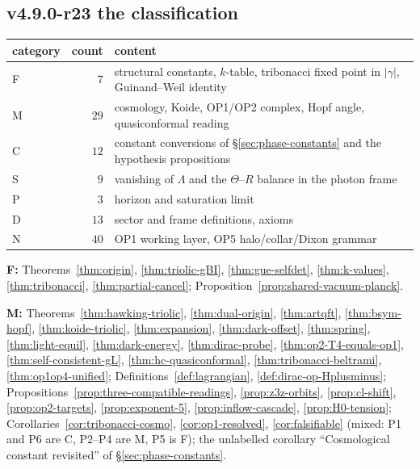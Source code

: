 \subsection*{v4.9.0-r23 the classification}
\label{subsec:v490-r23-classification}

\begin{center}
\small
\begin{tabular}{@{}lrl@{}}
\toprule
category & count & content\\
\midrule
F & \(7\) & structural constants, \(k\)-table, tribonacci fixed point in \(|\gamma|\), Guinand--Weil identity\\
M & \(29\) & cosmology, Koide, OP1/OP2 complex, Hopf angle, quasiconformal reading\\
C & \(12\) & constant conversions of \S\ref{sec:phase-constants} and the hypothesis propositions\\
S & \(9\) & vanishing of \(\Lambda\) and the \(\Theta\)--\(R\) balance in the photon frame\\
P & \(3\) & horizon and saturation limit\\
D & \(13\) & sector and frame definitions, axioms\\
N & \(40\) & OP1 working layer, OP5 halo/collar/Dixon grammar\\
\bottomrule
\end{tabular}
\end{center}

\noindent\textbf{F:} Theorems~\ref{thm:origin}, \ref{thm:triolic-gBI}, \ref{thm:gue-selfdet}, \ref{thm:k-values}, \ref{thm:tribonacci},
\ref{thm:partial-cancel}; Proposition~\ref{prop:shared-vacuum-planck}.

\noindent\textbf{M:} Theorems~\ref{thm:hawking-triolic}, \ref{thm:dual-origin}, \ref{thm:artqft}, \ref{thm:bsym-hopf},
\ref{thm:koide-triolic}, \ref{thm:expansion}, \ref{thm:dark-offset}, \ref{thm:spring}, \ref{thm:light-equil}, \ref{thm:dark-energy},
\ref{thm:dirac-probe}, \ref{thm:op2-T4-equals-op1}, \ref{thm:self-consistent-gL}, \ref{thm:hc-quasiconformal},
\ref{thm:tribonacci-beltrami}, \ref{thm:op1op4-unified}; Definitions~\ref{def:lagrangian}, \ref{def:dirac-op-Hplusminus};
Propositions~\ref{prop:three-compatible-readings}, \ref{prop:z3z-orbits}, \ref{prop:cl-shift}, \ref{prop:op2-targets},
\ref{prop:exponent-5}, \ref{prop:inflow-cascade}, \ref{prop:H0-tension}; Corollaries~\ref{cor:tribonacci-cosmo},
\ref{cor:op1-resolved}, \ref{cor:falsifiable} (mixed: P1 and P6 are C, P2--P4 are M, P5 is F); the unlabelled corollary
``Cosmological constant revisited'' of \S\ref{sec:phase-constants}.

